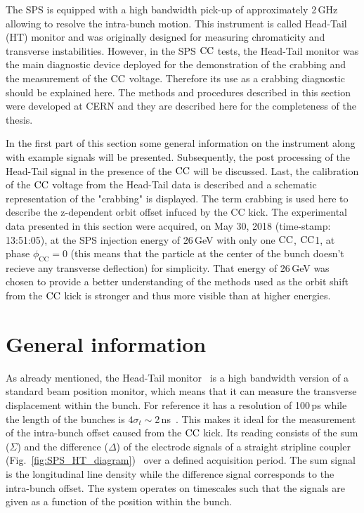 The SPS is equipped with a high bandwidth pick-up of approximately 2\,GHz allowing to resolve the intra-bunch motion. This instrument is called Head-Tail (HT) monitor and was originally designed for measuring chromaticity and transverse instabilities. However, in the SPS ${\mathrm{CC}}$ tests, the Head-Tail monitor was the main diagnostic device deployed for the demonstration of the crabbing and the measurement of the ${\mathrm{CC}}$ voltage. Therefore its use as a crabbing diagnostic should be explained here. The methods and procedures described in this section were developed at CERN and they are described here for the completeness of the thesis.

In the first part of this section some general information on the instrument along with example signals will be presented. Subsequently, the post processing of the Head-Tail signal in the presence of the ${\mathrm{CC}}$ will be discussed. Last, the calibration of the ${\mathrm{CC}}$ voltage from the Head-Tail data is described and a schematic representation of the "crabbing" is displayed. The term crabbing is used here to describe the z-dependent orbit offset infuced by the CC kick. The experimental data presented in this section were acquired, on May 30, 2018 (time-stamp: 13:51:05), at the SPS injection energy of 26\,GeV with only one ${\mathrm{CC}}$, ${\mathrm{CC}}$1, at phase $\phi_\mathrm{CC}=0$ (this means that the particle at the center of the bunch doesn't recieve any transverse deflection) for simplicity. That energy of 26\,GeV was chosen to provide a better understanding of the methods used as the orbit shift from the ${\mathrm{CC}}$ kick is stronger and thus more visible than at higher energies.

\section{General information}\label{subsec:HT_general_info}
As already mentioned, the Head-Tail monitor~\cite{sps_headtail_monitor} is a high bandwidth version of a standard beam position monitor, which means that it can measure the transverse displacement within the bunch. For reference it has a resolution of 100\,ps while the length of the bunches is $4\sigma_t \sim $2\,ns~\cite{Carver:2696108}.  This makes it ideal for the measurement of the intra-bunch offset caused from the ${\mathrm{CC}}$ kick. Its reading consists of the sum ($\Sigma$) and the  difference ($\Delta$) of the electrode signals of a straight stripline coupler (Fig.~\ref{fig:SPS_HT_diagram})~\cite{Jones:987561, Levens:2313358} over a defined acquisition period. The sum signal is the longitudinal line density while the difference signal corresponds to the intra-bunch offset. The system operates on timescales such that the signals are given as a function of the position within the bunch.

